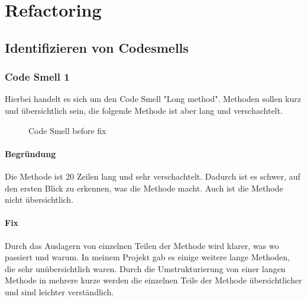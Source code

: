 
\chapter{Refactoring}
\label{refactoring}

\section{Identifizieren von Codesmells}

    \subsection{Code Smell 1}
    Hierbei handelt es sich um den Code Smell "Long method". Methoden sollen kurz und übersichtlich sein, die folgende Methode ist aber lang und verschachtelt.
    
    \begin{figure}[h]
	    \centering
	    \caption{Code Smell  before fix}
	    \label{a.2.cleanArchitecture}
    \end{figure}
    
    
        \subsubsection{Begründung}
        Die Methode ist 20 Zeilen lang und sehr verschachtelt. Dadurch ist es schwer, auf den ersten Blick zu erkennen, was die Methode macht. Auch ist die Methode nicht übersichtlich.

        \subsubsection{Fix}
        Durch das Auslagern von einzelnen Teilen der Methode wird klarer, was wo passiert und warum. In meinem Projekt gab es einige weitere lange Methoden, die sehr unübersichtlich waren. Durch die Umstrukturierung von einer langen Methode in mehrere kurze werden die einzelnen Teile der Methode übersichtlicher und sind leichter verständlich.
    
